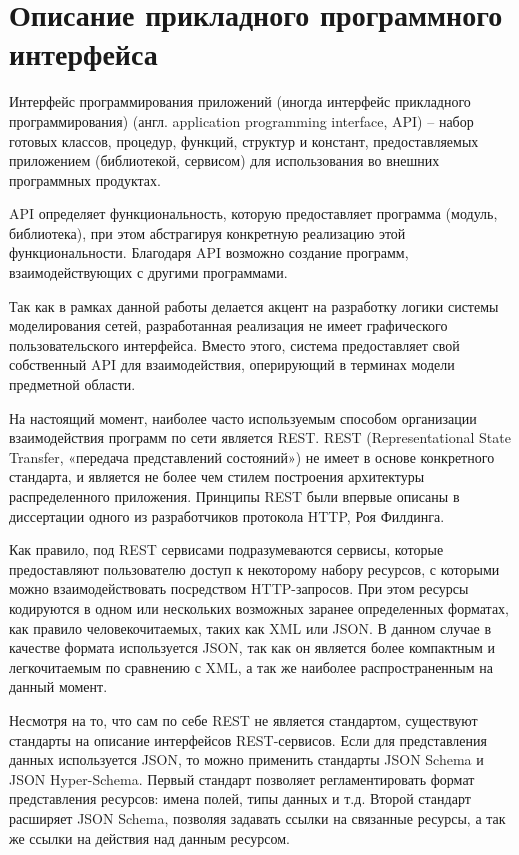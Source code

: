 \section{Описание прикладного программного интерфейса}
Интерфейс программирования приложений (иногда интерфейс прикладного программирования) (англ. application programming interface, API) --  набор готовых классов, процедур, функций, структур и констант, предоставляемых приложением (библиотекой, сервисом) для использования во внешних программных продуктах.

API определяет функциональность, которую предоставляет программа (модуль, библиотека), при этом абстрагируя конкретную реализацию этой функциональности. Благодаря API возможно создание
программ, взаимодействующих с другими программами.

Так как в рамках данной работы делается акцент на разработку логики системы моделирования сетей,
разработанная реализация не имеет графического пользовательского интерфейса. Вместо этого,
система предоставляет свой собственный API для взаимодействия, оперирующий в терминах 
модели предметной области.

На настоящий момент, наиболее часто используемым способом организации взаимодействия
программ по сети является REST. REST (Representational State Transfer, «передача представлений 
состояний») не имеет в основе конкретного стандарта, и является не более чем стилем построения 
архитектуры распределенного приложения. Принципы REST были впервые описаны в диссертации
одного из разработчиков протокола HTTP, Роя Филдинга.

Как правило, под REST сервисами подразумеваются сервисы, которые предоставляют пользователю
доступ к некоторому набору ресурсов, с которыми можно взаимодействовать посредством
HTTP-запросов. При этом ресурсы кодируются в одном или нескольких возможных заранее
определенных форматах, как правило человекочитаемых, таких как XML или JSON.
В данном случае в качестве формата используется JSON, так как он является более компактным
и легкочитаемым по сравнению с XML, а так же наиболее распространенным на данный момент.

Несмотря на то, что сам по себе REST не является стандартом, существуют стандарты на описание
интерфейсов REST-сервисов. Если для представления данных используется JSON, то можно
применить стандарты JSON Schema и JSON Hyper-Schema. Первый стандарт позволяет
регламентировать формат представления ресурсов: имена полей, типы данных и т.д. Второй
стандарт расширяет JSON Schema, позволяя задавать ссылки на связанные ресурсы, а так же
ссылки на действия над данным ресурсом.


